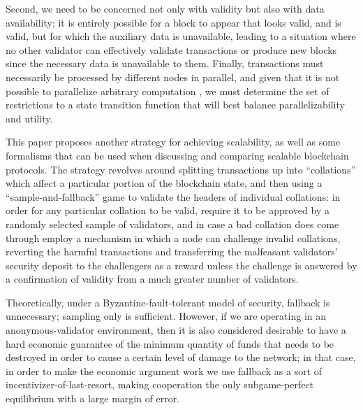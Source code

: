 \documentclass[11pt,a4paper]{article}
\theoremstyle{plain}
\theoremstyle{definition}
\theoremstyle{remark}
\begin{document}
Second, we need to be concerned not only with validity but also with data availability; it is entirely possible for a block to appear that looks valid, and is valid, but for which the auxiliary data is unavailable, leading to a situation where no other validator can effectively validate transactions or produce new blocks since the necessary data is unavailable to them. Finally, transactions must necessarily be processed by different nodes in parallel, and given that it is not possible to parallelize arbitrary computation \cite{parallelcomputing}, we must determine the set of restrictions to a state transition function that will best balance parallelizability and utility.

This paper proposes another strategy for achieving scalability, as well as some formalisms that can be used when discussing and comparing scalable blockchain protocols. The strategy revolves around splitting transactions up into ``collations'' which affect a particular portion of the blockchain state, and then using a ``sample-and-fallback'' game to validate the headers of individual collations: in order for any particular collation to be valid, require it to be approved by a randomly selected sample of validators, and in case a bad collation does come through employ a mechanism in which a node can challenge invalid collations, reverting the harmful transactions and transferring the malfeasant validators' security deposit to the challengers as a reward unless the challenge is answered by a confirmation of validity from a much greater number of validators.

Theoretically, under a Byzantine-fault-tolerant model of security, fallback is unnecessary; sampling only is sufficient. However, if we are operating in an anonymous-validator environment, then it is also considered desirable to have a hard economic guarantee of the minimum quantity of funds that needs to be destroyed in order to cause a certain level of damage to the network; in that case, in order to make the economic argument work we use fallback as a sort of incentivizer-of-last-resort, making cooperation the only subgame-perfect equilibrium with a large margin of error.
\end{document}
